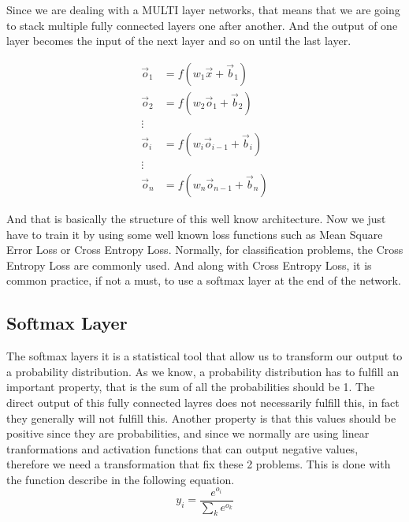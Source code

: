 \documentclass[english,preprint,JIP]{ipsj}
\begin{document}
Since we are dealing with a MULTI layer networks, that means that we are going
to stack multiple fully connected layers one after another. And the output of
one layer becomes the input of the next layer and so on until the last layer.

\begin{align*}
    \vec{o}_1 & = f(w_1\vec{x} + \vec{b}_1)       \\
    \vec{o}_2 & = f(w_2\vec{o}_1 + \vec{b}_2)     \\
    \vdots    &                                   \\
    \vec{o}_i & = f(w_i\vec{o}_{i-1} + \vec{b}_i) \\
    \vdots    &                                   \\
    \vec{o}_n & = f(w_n\vec{o}_{n-1} + \vec{b}_n)
\end{align*}

And that is basically the structure of this well know architecture. Now we just
have to train it by using some well known loss functions such as Mean Square
Error Loss or Cross Entropy Loss. Normally, for classification problems, the
Cross Entropy Loss are commonly used. And along with Cross Entropy Loss, it is
common practice, if not a must, to use a softmax layer at the end of the
network.\\

\subsection{Softmax Layer}
The softmax layers it is a statistical tool that allow us to transform our
output to a probability distribution. As we know, a probability distribution has
to fulfill an important property, that is the sum of all the probabilities
should be 1. The direct output of this fully connected layres does not
necessarily fulfill this, in fact they generally will not fulfill this. Another
property is that this values should be positive since they are probabilities,
and since we normally are using linear tranformations and activation functions
that can output negative values, therefore we need a transformation that fix
these 2 problems. This is done with the function describe in the following equation.
\begin{equation}
    y_{i} = \frac{e^{o_i}}{\sum_k e^{o_k}}
\end{equation}
\end{document}
